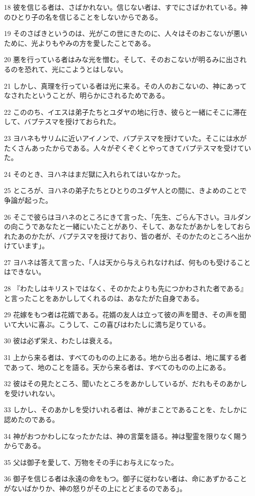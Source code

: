 \par 18 彼を信じる者は、さばかれない。信じない者は、すでにさばかれている。神のひとり子の名を信じることをしないからである。
\par 19 そのさばきというのは、光がこの世にきたのに、人々はそのおこないが悪いために、光よりもやみの方を愛したことである。
\par 20 悪を行っている者はみな光を憎む。そして、そのおこないが明るみに出されるのを恐れて、光にこようとはしない。
\par 21 しかし、真理を行っている者は光に来る。その人のおこないの、神にあってなされたということが、明らかにされるためである。
\par 22 こののち、イエスは弟子たちとユダヤの地に行き、彼らと一緒にそこに滞在して、バプテスマを授けておられた。
\par 23 ヨハネもサリムに近いアイノンで、バプテスマを授けていた。そこには水がたくさんあったからである。人々がぞくぞくとやってきてバプテスマを受けていた。
\par 24 そのとき、ヨハネはまだ獄に入れられてはいなかった。
\par 25 ところが、ヨハネの弟子たちとひとりのユダヤ人との間に、きよめのことで争論が起った。
\par 26 そこで彼らはヨハネのところにきて言った、「先生、ごらん下さい。ヨルダンの向こうであなたと一緒にいたことがあり、そして、あなたがあかしをしておられたあのかたが、バプテスマを授けており、皆の者が、そのかたのところへ出かけています」。
\par 27 ヨハネは答えて言った、「人は天から与えられなければ、何ものも受けることはできない。
\par 28 『わたしはキリストではなく、そのかたよりも先につかわされた者である』と言ったことをあかししてくれるのは、あなたがた自身である。
\par 29 花嫁をもつ者は花婿である。花婿の友人は立って彼の声を聞き、その声を聞いて大いに喜ぶ。こうして、この喜びはわたしに満ち足りている。
\par 30 彼は必ず栄え、わたしは衰える。
\par 31 上から来る者は、すべてのものの上にある。地から出る者は、地に属する者であって、地のことを語る。天から来る者は、すべてのものの上にある。
\par 32 彼はその見たところ、聞いたところをあかししているが、だれもそのあかしを受けいれない。
\par 33 しかし、そのあかしを受けいれる者は、神がまことであることを、たしかに認めたのである。
\par 34 神がおつかわしになったかたは、神の言葉を語る。神は聖霊を限りなく賜うからである。
\par 35 父は御子を愛して、万物をその手にお与えになった。
\par 36 御子を信じる者は永遠の命をもつ。御子に従わない者は、命にあずかることがないばかりか、神の怒りがその上にとどまるのである」。

